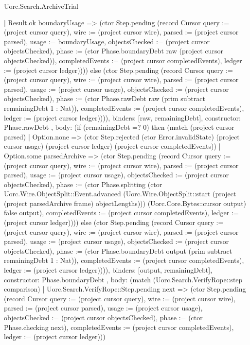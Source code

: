 \begin{lexlean}{Uorc.Search.ArchiveTrial}
\begin{semanticmodule}
{{{          | Result.ok boundaryUsage => (ctor Step.pending (record Cursor {query := (project cursor query), wire := (project cursor wire), parsed := (project cursor parsed), usage := boundaryUsage, objectsChecked := (project cursor objectsChecked), phase := (ctor Phase.boundaryDebt raw (project cursor objectsChecked)), completedEvents := (project cursor completedEvents), ledger := (project cursor ledger)}))) else (ctor Step.pending (record Cursor {query := (project cursor query), wire := (project cursor wire), parsed := (project cursor parsed), usage := (project cursor usage), objectsChecked := (project cursor objectsChecked), phase := (ctor Phase.rawDebt raw (prim subtract remainingDebt 1 : Nat)), completedEvents := (project cursor completedEvents), ledger := (project cursor ledger)}))),
        binders: [raw, remainingDebt],
        constructor: Phase.rawDebt
      },
      {
        body: (if (remainingDebt =? 0) then (match (project cursor parsed)
          | Option.none => (ctor Step.rejected (ctor Error.invalidState) (project cursor usage) (project cursor ledger) (project cursor completedEvents))
          | Option.some parsedArchive => (ctor Step.pending (record Cursor {query := (project cursor query), wire := (project cursor wire), parsed := (project cursor parsed), usage := (project cursor usage), objectsChecked := (project cursor objectsChecked), phase := (ctor Phase.splitting (ctor Uorc.Wire.ObjectSplit::Event.advanced (Uorc.Wire.ObjectSplit::start (project (project parsedArchive frame) objectLengths))) (Uorc.Core.Bytes::cursor output) false output), completedEvents := (project cursor completedEvents), ledger := (project cursor ledger)}))) else (ctor Step.pending (record Cursor {query := (project cursor query), wire := (project cursor wire), parsed := (project cursor parsed), usage := (project cursor usage), objectsChecked := (project cursor objectsChecked), phase := (ctor Phase.boundaryDebt output (prim subtract remainingDebt 1 : Nat)), completedEvents := (project cursor completedEvents), ledger := (project cursor ledger)}))),
        binders: [output, remainingDebt],
        constructor: Phase.boundaryDebt
      },
      {
        body: (match (Uorc.Search.VerifyRope::step comparison)
          | Uorc.Search.VerifyRope::Step.pending next => (ctor Step.pending (record Cursor {query := (project cursor query), wire := (project cursor wire), parsed := (project cursor parsed), usage := (project cursor usage), objectsChecked := (project cursor objectsChecked), phase := (ctor Phase.checking next), completedEvents := (project cursor completedEvents), ledger := (project cursor ledger)}))
}}}
\end{semanticmodule}
\end{lexlean}
